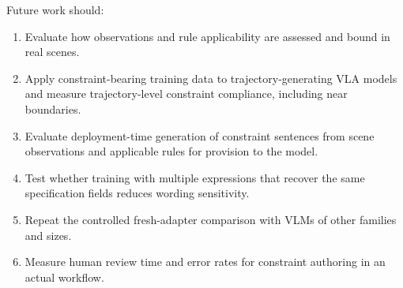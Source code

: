 Future work should:
\begin{enumerate}
\item Evaluate how observations and rule applicability are assessed and bound
in real scenes.
\item Apply constraint-bearing training data to trajectory-generating VLA
models and measure trajectory-level constraint compliance, including near boundaries.
\item Evaluate deployment-time generation of constraint sentences from scene
observations and applicable rules for provision to the model.
\item Test whether training with multiple expressions that recover the same
specification fields reduces wording sensitivity.
\item Repeat the controlled fresh-adapter comparison with VLMs of other
families and sizes.
\item Measure human review time and error rates for constraint authoring in
an actual workflow.
\end{enumerate}
